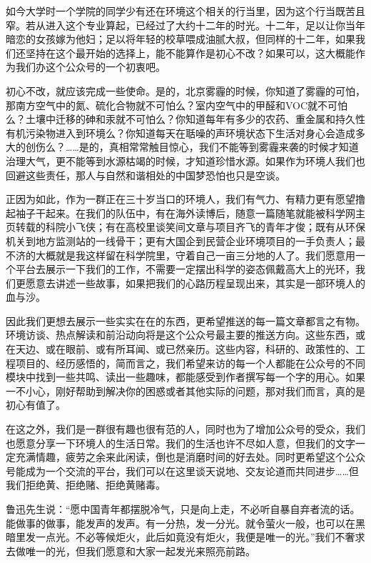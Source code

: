 \documentclass[]{book}
\begin{document}
如今大学时一个学院的同学少有还在环境这个相关的行当里，因为这个行当既苦且窄。若从进入这个专业算起，已经过了大约十二年的时光。十二年，足以让你当年暗恋的女孩嫁为他妇；足以将年轻的校草喂成油腻大叔，但同样的十二年，如果我们还坚持在这个最开始的选择上，能不能算作是初心不改？如果可以，这大概能作为我们办这个公众号的一个初衷吧。

初心不改，就应该完成一些使命。是的，北京雾霾的时候，你知道了雾霾的可怕，那南方空气中的氮、硫化合物就不可怕么？室内空气中的甲醛和VOC就不可怕么？土壤中迁移的砷和汞就不可怕么？你知道每年有多少的农药、重金属和持久性有机污染物进入到环境么？你知道每天在聒噪的声环境状态下生活对身心会造成多大的创伤么？\ldots{}\ldots{}是的，真相常常触目惊心，我们不能等到雾霾来袭的时候才知道治理大气，更不能等到水源枯竭的时候，才知道珍惜水源。如果作为环境人我们也回避这些责任，那人与自然和谐相处的中国梦恐怕也只是空谈。

正因为如此，作为一群正在三十岁当口的环境人，我们有气力、有精力更有愿望撸起袖子干起来。在我们的队伍中，有在海外读博后，随意一篇随笔就能被科学网主页转载的科院小飞侠；有在高校里谈笑间文章与项目齐飞的青年才俊；既有从环保机关到地方监测站的一线骨干；更有大国企到民营企业环境项目的一手负责人；最不济的大概就是我这样留在科学院里，守着自己一亩三分地的人了。我们愿意用一个平台去展示一下我们的工作，不需要一定摆出科学的姿态佩戴高大上的光环，我们更愿意去讲述一些故事，如果把我们的心路历程呈现出来，其实是一部环境人的血与沙。

因此我们更想去展示一些实实在在的东西，更希望推送的每一篇文章都言之有物。环境访谈、热点解读和前沿动向将是这个公众号最主要的推送方向。这些东西，或在天边、或在眼前、或有所耳闻、或已然亲历。这些内容，科研的、政策性的、工程项目的、经历感悟的，简而言之，我们希望来访的每一个人都能在公众号的不同模块中找到一些共鸣、读出一些趣味，都能感受到作者撰写每一个字的用心。如果一不小心，刚好帮助到解决你的困惑或者其他实际的问题，那对我们而言，真的是初心有值了。

在这之外，我们是一群很有趣也很有范的人，同时也为了增加公众号的受众，我们也愿意分享一下环境人的生活日常。我们的生活也许不尽如人意，但我们的文字一定充满情趣，疲劳之余来此闲读，倒也是消磨时间的好去处。同时更希望这个公众号能成为一个交流的平台，我们可以在这里谈天说地、交友论道而共同进步\ldots{}\ldots{}但我们拒绝黄、拒绝赌、拒绝黄赌毒。

鲁迅先生说：``愿中国青年都摆脱冷气，只是向上走，不必听自暴自弃者流的话。能做事的做事，能发声的发声。有一分热，发一分光。就令萤火一般，也可以在黑暗里发一点光。不必等候炬火，此后如竟没有炬火，我便是唯一的光。''我们不奢求去做唯一的光，但我们愿意和大家一起发光来照亮前路。
\end{document}
